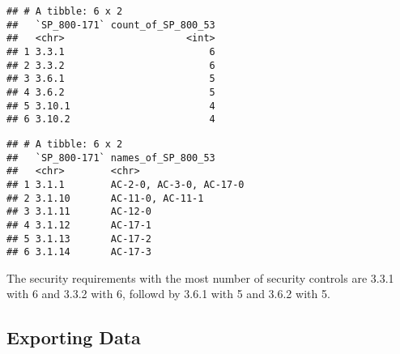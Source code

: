 \documentclass[]{article}
\newenvironment{Shaded}{\begin{snugshade}}{\end{snugshade}}
\newcommand{\KeywordTok}[1]{\textcolor[rgb]{0.13,0.29,0.53}{\textbf{#1}}}
\newcommand{\DataTypeTok}[1]{\textcolor[rgb]{0.13,0.29,0.53}{#1}}
\newcommand{\StringTok}[1]{\textcolor[rgb]{0.31,0.60,0.02}{#1}}
\newcommand{\OperatorTok}[1]{\textcolor[rgb]{0.81,0.36,0.00}{\textbf{#1}}}
\newcommand{\NormalTok}[1]{#1}
\begin{document}
\begin{verbatim}
## # A tibble: 6 x 2
##   `SP_800-171` count_of_SP_800_53
##   <chr>                     <int>
## 1 3.3.1                         6
## 2 3.3.2                         6
## 3 3.6.1                         5
## 4 3.6.2                         5
## 5 3.10.1                        4
## 6 3.10.2                        4
\end{verbatim}

\begin{Shaded}
\end{Shaded}

\begin{verbatim}
## # A tibble: 6 x 2
##   `SP_800-171` names_of_SP_800_53     
##   <chr>        <chr>                  
## 1 3.1.1        AC-2-0, AC-3-0, AC-17-0
## 2 3.1.10       AC-11-0, AC-11-1       
## 3 3.1.11       AC-12-0                
## 4 3.1.12       AC-17-1                
## 5 3.1.13       AC-17-2                
## 6 3.1.14       AC-17-3
\end{verbatim}

The security requirements with the most number of security controls are
3.3.1 with 6 and 3.3.2 with 6, followd by 3.6.1 with 5 and 3.6.2 with 5.

\subsection{Exporting Data}\label{exporting-data}
\end{document}
